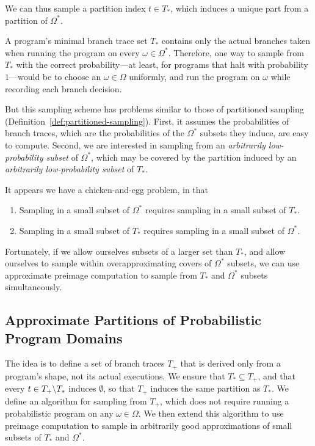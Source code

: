 We can thus sample a partition index $t \in T_*$, which induces a unique part from a partition of $\Omega^*$.

A program's minimal branch trace set $T_*$ contains only the actual branches taken when running the program on every $\omega \in \Omega^*$.
Therefore, one way to sample from $T_*$ with the correct probability---at least, for programs that halt with probability $1$---would be to choose an $\omega \in \Omega$ uniformly, and run the program on $\omega$ while recording each branch decision.

But this sampling scheme has problems similar to those of partitioned sampling (Definition~\ref{def:partitioned-sampling}).
First, it assumes the probabilities of branch traces, which are the probabilities of the $\Omega^*$ subsets they induce, are easy to compute.
Second, we are interested in sampling from an \emph{arbitrarily low-probability subset} of $\Omega^*$, which may be covered by the partition induced by an \emph{arbitrarily low-probability subset} of $T_*$.

It appears we have a chicken-and-egg problem, in that
\begin{enumerate}
	\item Sampling in a small subset of $\Omega^*$ requires sampling in a small subset of $T_*$.
	\item Sampling in a small subset of $T_*$ requires sampling in a small subset of $\Omega^*$.
\end{enumerate}
Fortunately, if we allow ourselves subsets of a larger set than $T_*$, and allow ourselves to sample within overapproximating covers of $\Omega^*$ subsets, we can use approximate preimage computation to sample from $T_*$ and $\Omega^*$ subsets simultaneously.

\subsection{Approximate Partitions of Probabilistic Program Domains}

The idea is to define a set of branch traces $T_+$ that is derived only from a program's shape, not its actual executions.
We ensure that $T_* \subseteq T_+$, and that every $t \in T_+ \backslash T_*$ induces $\emptyset$, so that $T_+$ induces the same partition as $T_*$.
We define an algorithm for sampling from $T_+$, which does not require running a probabilistic program on any $\omega \in \Omega$.
We then extend this algorithm to use preimage computation to sample in arbitrarily good approximations of small subsets of $T_*$ and $\Omega^*$.

